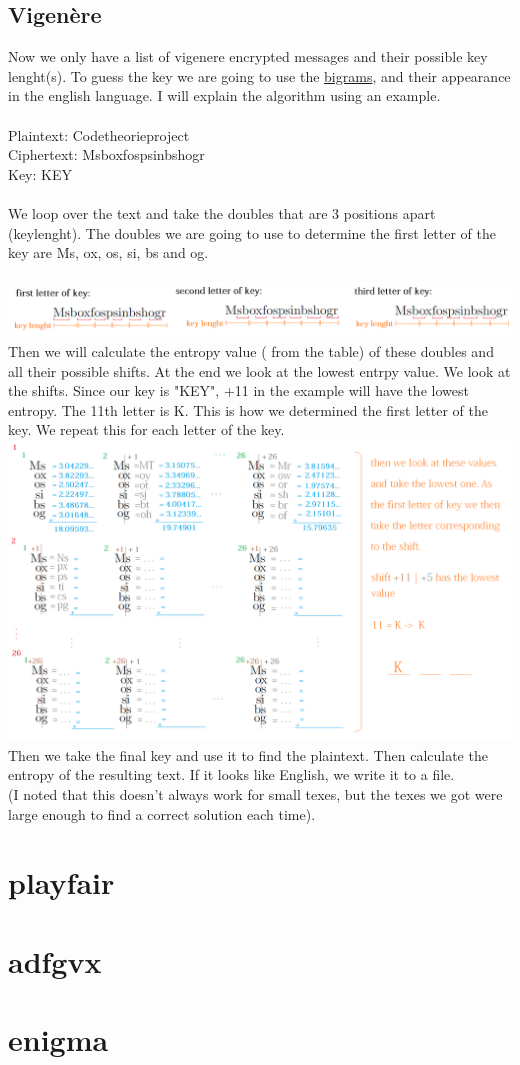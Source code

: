 \documentclass{article}
\begin{document}
\subsection{Vigenère}
Now we only have a list of vigenere encrypted messages and their possible key lenght(s). To guess the key we are going to use the \href{http://practicalcryptography.com/media/cryptanalysis/files/english_bigrams_1.txt}{bigrams}, and their appearance in the english language. I will explain the algorithm using an example.\\
\\
Plaintext: Codetheorieproject\\
Ciphertext: Msboxfospsinbshogr\\
Key: KEY\\
\\
We loop over the text and take the doubles that are 3 positions apart (keylenght). The doubles we are going to use to determine the first letter of the key are Ms, ox, os, si, bs and og.\\
\\
\hspace*{-0.5in}
\includegraphics[scale=0.60]{image1.png}
\\
Then we will calculate the entropy value ( from the table) of these doubles and all their possible shifts. At the end we look at the lowest entrpy value. We look at the shifts. Since our key is "KEY", +11 in the example will have the lowest entropy. The 11th letter is K. This is how we determined the first letter of the key. We repeat this for each letter of the key.\\
\hspace*{-0.5in}
\includegraphics[scale=0.60]{image2.png}
\\
Then we take the final key and use it to find the plaintext. Then calculate the entropy of the resulting text. If it looks like English, we write it to a file. \\
(I noted that this doesn't always work for small texes, but the texes we got were large enough to find a correct solution each time).

\section{playfair}
\section{adfgvx}
\section{enigma}
\end{document}
